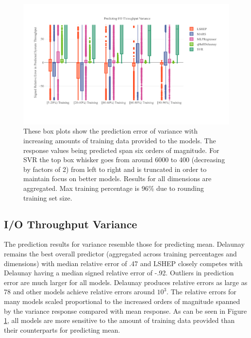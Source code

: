 \documentclass{scspaperproc}
\theoremstyle{scsthe}
\begin{document}
\begin{figure}
  \centering
  \includegraphics[width=\textwidth,trim={0 .5in 0 .3in}]{Var_TT_Ratio.pdf}
  \caption{These box plots show the prediction error of variance with
    increasing amounts of training data provided to the models. The
    response values being predicted span six orders of magnitude. For
    SVR the top box whisker goes from around 6000 to 400 (decreasing
    by factors of 2) from left to right and is truncated in order to
    maintain focus on better models. Results for all dimensions are
    aggregated. Max training percentage is 96\% due to rounding
    training set size.}
  \label{fig:var_tt_ratio}
\end{figure}
 
\vspace{-10pt}
\subsection{I/O Throughput Variance}
\vspace{-10pt} The prediction results for variance resemble those for
predicting mean. Delaunay remains the best overall predictor
(aggregated across training percentages and dimensions) with median
relative error of .47 and LSHEP closely competes with Delaunay having
a median signed relative error of -.92. Outliers in prediction error
are much larger for all models. Delaunay produces relative errors as
large as 78 and other models achieve relative errors around
$10^3$. The relative errors for many models scaled proportional to the
increased orders of magnitude spanned by the variance response
compared with mean response. As can be seen in Figure
\ref{fig:var_tt_ratio}, all models are more sensitive to the amount of
training data provided than their counterparts for predicting mean.
\end{document}

